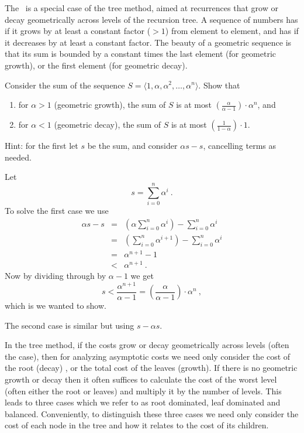 \begin{gram}
  The~ is a special case of the tree method, aimed
  at recurrences that grow or decay geometrically across levels of the
  recursion tree.
%
  A sequence of numbers has  if it grows by at
  least a constant factor ($> 1$) from element to element, and has  if it decreases by at least a constant
  factor.  
%
  The beauty of a geometric sequence is that its sum is
  bounded by a constant times the last element (for geometric growth), or
  the first element (for geometric decay).
\end{gram}
\begin{flex}
\begin{exercise}
  Consider the sum of the sequence $S = \langle 1, \alpha, \alpha^2,
  \ldots, \alpha^n \rangle$.   Show that
\begin{enumerate}
\item
 for $\alpha > 1$ (geometric growth), the sum of $S$ is at most
  $\left(\frac{\alpha}{\alpha -1}\right) \cdot \alpha^n$, and 
\item
for $\alpha < 1$ (geometric decay), the
  sum of $S$ is at most  $\left(\frac{1}{1 - \alpha}\right) \cdot 1$.
\end{enumerate}
Hint: for the first let $s$ be the sum, and consider $\alpha s - s$, cancelling
terms as needed.
\end{exercise}
\begin{solution}
Let
\[s = \sum_{i=0}^n \alpha^i~.\]
To solve the first case we use
\[ 
\begin{array}{lcl}
\alpha s - s & = & \left(\alpha \sum_{i=0}^n \alpha^i\right) -
                   \sum_{i=0}^n \alpha^i\\
                  & = & \left(\sum_{i=0}^n \alpha^{i+1}\right) -
                        \sum_{i=0}^n \alpha^i\\
                  & = & \alpha^{n+1} - 1\\
                  & < & \alpha^{n+1} ~.
\end{array}
\]
Now by dividing through by $\alpha - 1$ we get
\[ s < \frac{\alpha^{n+1}}{\alpha-1} = \left(\frac{\alpha}{\alpha-1}\right)
  \cdot \alpha^n~, \]
which is we wanted to show.

The second case is similar but using $s - \alpha s$.
\end{solution}
\end{flex}
\begin{gram}
  In the tree method, if the costs grow or decay geometrically across
  levels (often the case), then for analyzing asymptotic costs we need only consider the
  cost of the root (decay) , or the total cost of the leaves (growth).
%
  If there is no geometric growth or decay then it often suffices to
  calculate the cost of the worst level (often either the root or
  leaves) and multiply it by the number of levels.
%
  This leads to three cases which we refer to as root dominated, leaf 
  dominated and balanced.   
%  
  Conveniently, to distinguish these three cases 
  we need only consider the cost of each node in the 
  tree and how it relates to the cost of its children.
\end{gram}

